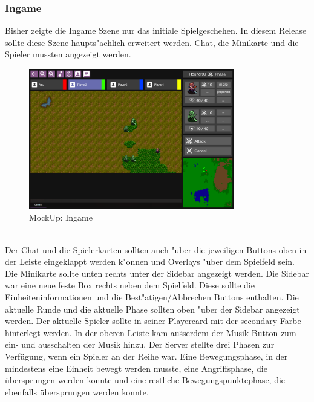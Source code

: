 \documentclass[12pt, titlepage]{scrartcl}
\newcounter{subsubsubsection}[subsubsection]
\begin{document}
		    \subsubsection{Ingame}
		        Bisher zeigte die Ingame Szene nur das initiale Spielgeschehen. In diesem Release sollte diese Szene haupts"achlich erweitert werden. Chat, die Minikarte und die Spieler mussten angezeigt werden. \\
		        \begin{figure}[H] 
    				\centering
    				\includegraphics[width=0.8\textwidth]{images/mockUps/Ingame.png}
    				\caption{MockUp: Ingame}
    				\label{Ingame_View}
			    \end{figure}
		    	\ \\   Der Chat und die Spielerkarten sollten auch "uber die jeweiligen Buttons oben in der Leiste eingeklappt werden k"onnen und Overlays "uber dem Spielfeld sein. Die Minikarte sollte unten rechts unter der Sidebar angezeigt werden. Die Sidebar war eine neue feste Box rechts neben dem Spielfeld. Diese sollte die Einheiteninformationen und die Best"atigen/Abbrechen Buttons enthalten. Die aktuelle Runde und die aktuelle Phase sollten oben "uber der Sidebar angezeigt werden. Der aktuelle Spieler sollte in seiner Playercard mit der secondary Farbe hinterlegt werden. In der oberen Leiste kam au\"sserdem der Musik Button zum ein- und ausschalten der Musik hinzu.
			        Der Server stellte drei Phasen zur Verf\"ugung, wenn ein Spieler an der Reihe war. Eine Bewegungsphase, in der mindestens eine Einheit bewegt werden musste, eine Angriffsphase, die \"ubersprungen werden konnte und eine restliche Bewegungspunktephase, die ebenfalls \"ubersprungen werden konnte. \\
\end{document}
